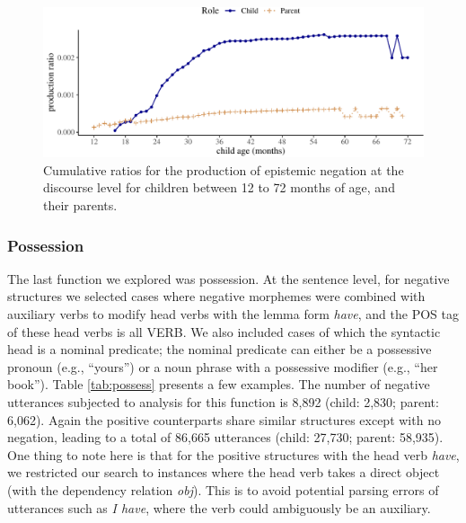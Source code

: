 \documentclass[
  english,
  man,floatsintext]{apa6}
\begin{document}
\begin{figure}[H]

{\centering \includegraphics{neg_construction_article_files/figure-latex/epistemicdiscourse-1} 

}

\caption{Cumulative ratios for the production of epistemic negation at the discourse level for children between 12 to 72 months of age, and their parents.}\label{fig:epistemicdiscourse}
\end{figure}

\hypertarget{possession}{%
\subsubsection{Possession}\label{possession}}

The last function we explored was possession. At the sentence level, for negative structures we selected cases where negative morphemes were combined with auxiliary verbs to modify head verbs with the lemma form \emph{have}, and the POS tag of these head verbs is all VERB. We also included cases of which the syntactic head is a nominal predicate; the nominal predicate can either be a possessive pronoun (e.g., ``yours'') or a noun phrase with a possessive modifier (e.g., ``her book''). Table \ref{tab:possess} presents a few examples. The number of negative utterances subjected to analysis for this function is 8,892 (child: 2,830; parent: 6,062). Again the positive counterparts share similar structures except with no negation, leading to a total of 86,665 utterances (child: 27,730; parent: 58,935). One thing to note here is that for the positive structures with the head verb \emph{have}, we restricted our search to instances where the head verb takes a direct object (with the dependency relation \emph{obj}). This is to avoid potential parsing errors of utterances such as \emph{I have}, where the verb could ambiguously be an auxiliary.
\end{document}
